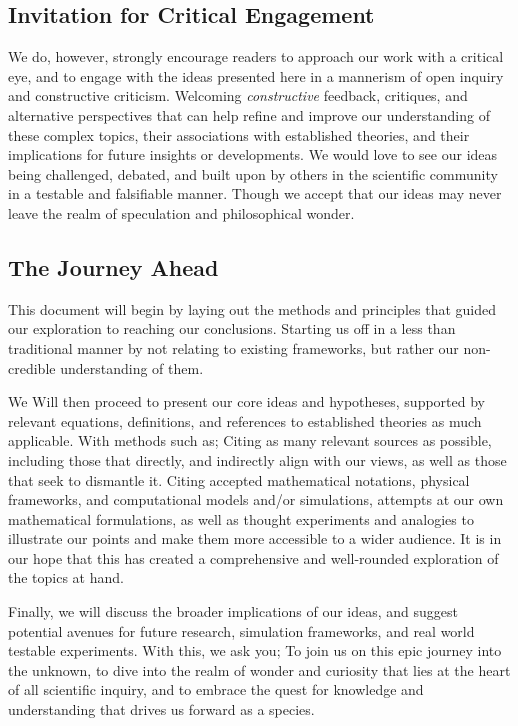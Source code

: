\documentclass[11pt]{article}
\begin{document}
    \subsection{Invitation for Critical Engagement}
        \hspace{1em}
        We do, however, strongly encourage readers to approach our work with a critical eye, and to engage with the ideas presented here in a mannerism of open inquiry and constructive criticism.
        Welcoming \emph{constructive} feedback, critiques, and alternative perspectives that can help refine and improve our understanding of these complex topics, their associations with established theories, and their implications for future insights or developments.
        We would love to see our ideas being challenged, debated, and built upon by others in the scientific community in a testable and falsifiable manner.
        Though we accept that our ideas may never leave the realm of speculation and philosophical wonder.

    \subsection{The Journey Ahead}
        \hspace{1em}
        This document will begin by laying out the methods and principles that guided our exploration to reaching our conclusions.
        Starting us off in a less than traditional manner by not relating to existing frameworks, but rather our non-credible understanding of them.

        We Will then proceed to present our core ideas and hypotheses, supported by relevant equations, definitions, and references to established theories as much applicable.
        With methods such as; Citing as many relevant sources as possible, including those that directly, and indirectly align with our views, as well as those that seek to dismantle it.
        Citing accepted mathematical notations, physical frameworks, and computational models and/or simulations, attempts at our own mathematical formulations,
        as well as thought experiments and analogies to illustrate our points and make them more accessible to a wider audience.
        It is in our hope that this has created a comprehensive and well-rounded exploration of the topics at hand.

        Finally, we will discuss the broader implications of our ideas, and suggest potential avenues for future research, simulation frameworks, and real world testable experiments.
        With this, we ask you; To join us on this epic journey into the unknown, to dive into the realm of wonder and curiosity that lies at the heart of all scientific inquiry,
        and to embrace the quest for knowledge and understanding that drives us forward as a species.
\newpage
\end{document}
